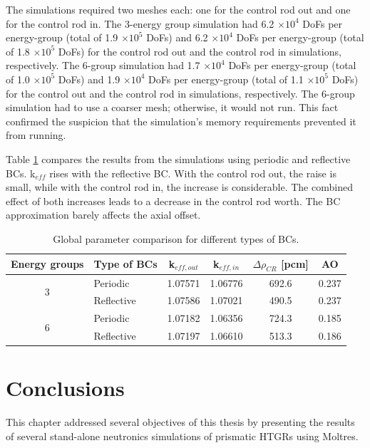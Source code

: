 The simulations required two meshes each: one for the control rod out and one for the control rod in.
The 3-energy group simulation had 6.2 $\times 10^4$ DoFs per energy-group (total of 1.9 $\times 10^5$ DoFs) and 6.2 $\times 10^4$ DoFs per energy-group (total of 1.8 $\times 10^5$ DoFs) for the control rod out and the control rod in simulations, respectively.
The 6-group simulation had 1.7 $\times 10^4$ DoFs per energy-group (total of 1.0 $\times 10^5$ DoFs) and 1.9 $\times 10^4$ DoFs per energy-group (total of 1.1 $\times 10^5$ DoFs) for the control out and the control rod in simulations, respectively.
The 6-group simulation had to use a coarser mesh; otherwise, it would not run.
This fact confirmed the suspicion that the simulation's memory requirements prevented it from running.

Table \ref{tab:benchmark-bc} compares the results from the simulations using periodic and reflective BCs.
k$_{eff}$ rises with the reflective BC.
With the control rod out, the raise is small, while with the control rod in, the increase is considerable.
The combined effect of both increases leads to a decrease in the control rod worth.
The BC approximation barely affects the axial offset.

\begin{table}[htbp!]
  \centering
  \caption{Global parameter comparison for different types of BCs.}
  \begin{tabular}{clcccc}
  \toprule
  Energy groups       & Type of BCs & k$_{eff, out}$ & k$_{eff, in}$ & $\Delta \rho_{CR}$ [pcm] & AO \\
  \midrule
  \multirow{2}{*}{3}  & Periodic     & 1.07571		& 1.06776		& 692.6		& 0.237		\\
                      & Reflective   & 1.07586	  & 1.07021   & 490.5		& 0.237	  \\ \hline
  \multirow{2}{*}{6}  & Periodic     & 1.07182		& 1.06356		& 724.3	  & 0.185  	\\
                      & Reflective   & 1.07197   	& 1.06610 	& 513.3		& 0.186		\\  
  \bottomrule
  \end{tabular}
  \label{tab:benchmark-bc}
\end{table}

\section{Conclusions}
\label{sec:neutr-conc}

This chapter addressed several objectives of this thesis by presenting the results of several stand-alone neutronics simulations of prismatic HTGRs using Moltres.

